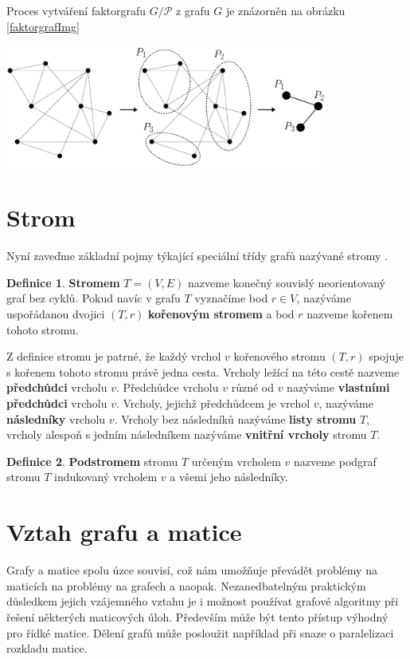 \documentclass[11pt,american,czech,oneside]{book}
\theoremstyle{plain}
\theoremstyle{definition}
\newtheorem{definition}{Definice}
\begin{document}
Proces vytváření faktorgrafu $G / \mathcal{P}$ z grafu $G$ je znázorněn na obrázku \ref{faktorgrafImg}

\bigskip
{
  \centering
  \includegraphics[width=0.8\textwidth]{pictures/faktorgrafcomplete.pdf}
}

\section{Strom}

Nyní zaveďme základní pojmy týkající speciální třídy grafů nazývané stromy \cite{koub:11}.

\begin{definition}
  \textbf{Stromem} $T=(V,E)$ nazveme konečný souvislý neorientovaný graf bez cyklů. Pokud navíc v grafu $T$ vyznačíme bod $r \in V$, nazýváme uspořádanou dvojici $(T,r)$ \textbf{kořenovým stromem} a bod $r$ nazveme kořenem tohoto stromu.
\end{definition}

Z definice stromu je patrné, že každý vrchol $v$ kořenového stromu $(T,r)$ spojuje s kořenem tohoto stromu právě jedna cesta.
Vrcholy ležící na této cestě nazveme \textbf{předchůdci} vrcholu $v$. Předchůdce vrcholu $v$ různé od $v$ nazýváme \textbf{vlastními předchůdci} vrcholu $v$. Vrcholy, jejichž předchůdcem je vrchol $v$, nazýváme \textbf{následníky} vrcholu $v$. Vrcholy bez následníků nazýváme \textbf{listy stromu} $T$, vrcholy alespoň s jedním následníkem nazýváme \textbf{vnitřní vrcholy} stromu $T$.

\begin{definition}
  \textbf{Podstromem} stromu $T$ určeným vrcholem $v$ nazveme podgraf stromu $T$ indukovaný vrcholem $v$ a všemi jeho následníky.
\end{definition}

\section{Vztah grafu a matice}
\label{GrMatRel}
Grafy a matice spolu úzce souvisí, což nám umožňuje převádět problémy na maticích na problémy na grafech a naopak. Nezanedbatelným praktickým důsledkem jejich vzájemného vztahu je i možnost používat grafové algoritmy při řešení některých maticových úloh. Především může být tento přístup výhodný pro řídké matice. Dělení grafů může posloužit například při snaze o paralelizaci rozkladu matice.
\end{document}
